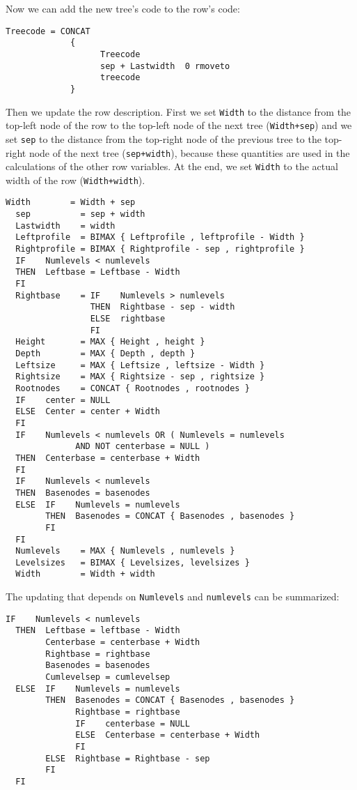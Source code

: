 \documentclass[11pt,english,BCOR10mm,DIV12,bibliography=totoc,parskip=false,smallheadings
    headexclude,footexclude,oneside]{pst-doc}
\begin{document}
Now we can add the new tree's code to the row's code:
\begin{lstlisting}[style=syntax]
  Treecode = CONCAT
             {
                   Treecode 
                   sep + Lastwidth  0 rmoveto
                   treecode
             }
\end{lstlisting}

Then we update the row description. First we set \verb|Width| to the distance from the top-left node of the row to 
the top-left node of the next tree (\verb=Width+sep=) and we set \verb|sep| to the distance from the top-right 
node of the previous tree to the top-right node of the next tree (\verb=sep+width=), because these quantities 
are used in the calculations of the other row variables. At the end, we set \verb|Width| to the actual 
width of the row (\verb|Width+width|).
\begin{lstlisting}[style=syntax]
  Width        = Width + sep
  sep          = sep + width
  Lastwidth    = width
  Leftprofile  = BIMAX { Leftprofile , leftprofile - Width }
  Rightprofile = BIMAX { Rightprofile - sep , rightprofile }
  IF    Numlevels < numlevels
  THEN  Leftbase = Leftbase - Width
  FI
  Rightbase    = IF    Numlevels > numlevels
                 THEN  Rightbase - sep - width
                 ELSE  rightbase
                 FI
  Height       = MAX { Height , height }
  Depth        = MAX { Depth , depth }
  Leftsize     = MAX { Leftsize , leftsize - Width }
  Rightsize    = MAX { Rightsize - sep , rightsize }
  Rootnodes    = CONCAT { Rootnodes , rootnodes }
  IF    center = NULL
  ELSE  Center = center + Width
  FI
  IF    Numlevels < numlevels OR ( Numlevels = numlevels
              AND NOT centerbase = NULL )
  THEN  Centerbase = centerbase + Width
  FI
  IF    Numlevels < numlevels
  THEN  Basenodes = basenodes
  ELSE  IF    Numlevels = numlevels
        THEN  Basenodes = CONCAT { Basenodes , basenodes }
        FI
  FI
  Numlevels    = MAX { Numlevels , numlevels }
  Levelsizes   = BIMAX { Levelsizes, levelsizes }
  Width        = Width + width
\end{lstlisting}

The updating that depends on \verb|Numlevels| and \verb|numlevels| can be summarized:
\begin{lstlisting}[style=syntax]
  IF    Numlevels < numlevels
  THEN  Leftbase = leftbase - Width
        Centerbase = centerbase + Width
        Rightbase = rightbase
        Basenodes = basenodes
        Cumlevelsep = cumlevelsep
  ELSE  IF    Numlevels = numlevels
        THEN  Basenodes = CONCAT { Basenodes , basenodes }
              Rightbase = rightbase
              IF    centerbase = NULL
              ELSE  Centerbase = centerbase + Width
              FI
        ELSE  Rightbase = Rightbase - sep
        FI
  FI
\end{lstlisting}
\end{document}
